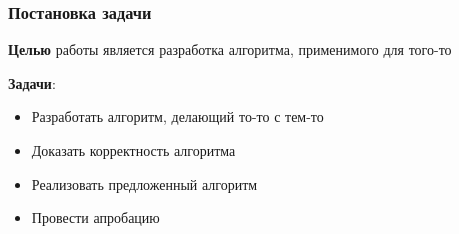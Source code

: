 \documentclass{beamer}
\begin{document}
\begin{frame}
  \transwipe[direction=90]
  \frametitle{Постановка задачи}
  \textbf{Целью} работы является разработка алгоритма, применимого для того-то  

  \textbf{Задачи}:
  \begin{itemize}
    \item Разработать алгоритм, делающий то-то с тем-то
    \item Доказать корректность алгоритма
    \item Реализовать предложенный алгоритм
    \item Провести апробацию
  \end{itemize}
\end{frame}
            
\end{document}
